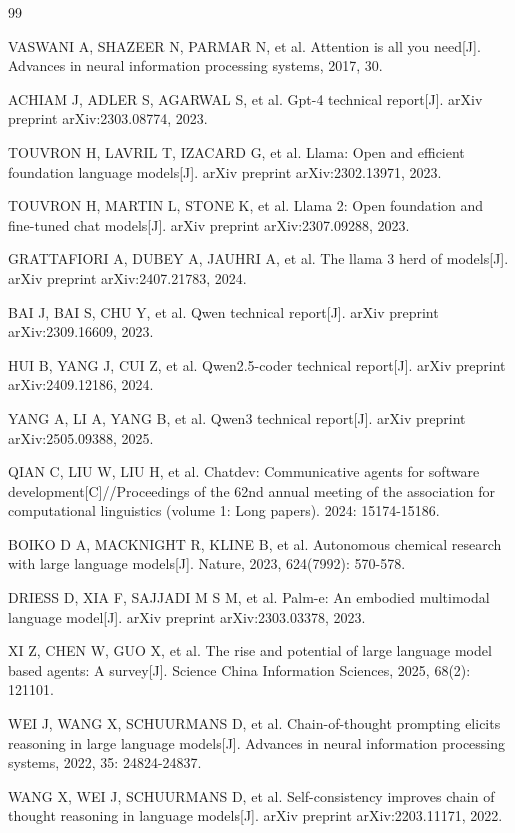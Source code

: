 \begin{thebibliography}{99}

VASWANI A, SHAZEER N, PARMAR N, et al. Attention is all you need[J]. Advances in neural information processing systems, 2017, 30.

ACHIAM J, ADLER S, AGARWAL S, et al. Gpt-4 technical report[J]. arXiv preprint arXiv:2303.08774, 2023.

TOUVRON H, LAVRIL T, IZACARD G, et al. Llama: Open and efficient foundation language models[J]. arXiv preprint arXiv:2302.13971, 2023.

TOUVRON H, MARTIN L, STONE K, et al. Llama 2: Open foundation and fine-tuned chat models[J]. arXiv preprint arXiv:2307.09288, 2023.

GRATTAFIORI A, DUBEY A, JAUHRI A, et al. The llama 3 herd of models[J]. arXiv preprint arXiv:2407.21783, 2024.

BAI J, BAI S, CHU Y, et al. Qwen technical report[J]. arXiv preprint arXiv:2309.16609, 2023.

HUI B, YANG J, CUI Z, et al. Qwen2.5-coder technical report[J]. arXiv preprint arXiv:2409.12186, 2024.

YANG A, LI A, YANG B, et al. Qwen3 technical report[J]. arXiv preprint arXiv:2505.09388, 2025.

QIAN C, LIU W, LIU H, et al. Chatdev: Communicative agents for software development[C]//Proceedings of the 62nd annual meeting of the association for computational linguistics (volume 1: Long papers). 2024: 15174-15186.

BOIKO D A, MACKNIGHT R, KLINE B, et al. Autonomous chemical research with large language models[J]. Nature, 2023, 624(7992): 570-578.

DRIESS D, XIA F, SAJJADI M S M, et al. Palm-e: An embodied multimodal language model[J]. arXiv preprint arXiv:2303.03378, 2023.

XI Z, CHEN W, GUO X, et al. The rise and potential of large language model based agents: A survey[J]. Science China Information Sciences, 2025, 68(2): 121101.

WEI J, WANG X, SCHUURMANS D, et al. Chain-of-thought prompting elicits reasoning in large language models[J]. Advances in neural information processing systems, 2022, 35: 24824-24837.

WANG X, WEI J, SCHUURMANS D, et al. Self-consistency improves chain of thought reasoning in language models[J]. arXiv preprint arXiv:2203.11171, 2022.


\end{thebibliography}
